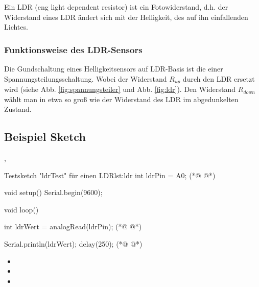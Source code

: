 Ein LDR (eng light dependent resistor)  ist ein Fotowiderstand, d.h.  der  Widerstand eines LDR ändert sich mit der Helligkeit, des auf ihn einfallenden Lichtes.

\subsubsection{Funktionsweise des LDR-Sensors}
Die Gundschaltung eines Helligkeitsensors auf LDR-Basis ist die einer Spannungsteilungsschaltung. Wobei
der  Widerstand $R_{up}$ durch den LDR ersetzt wird (siehe Abb. \ref{fig:spannungsteiler} und Abb. \ref{fig:ldr}).
Den Widerstand $R_{down}$ wählt man in etwa so groß wie der Widerstand des LDR im abgedunkelten Zustand.
  

\subsection{Beispiel Sketch}

\begin{multicols}{2}
\null\vfill
,\begin{arduinoCode}{Testsketch "ldrTest" für einen LDR}{lst:ldr}
int ldrPin = A0; (*@  @*) 

void setup(){
  Serial.begin(9600);
}

void loop(){
  int ldrWert = analogRead(ldrPin); (*@  @*)

  Serial.println(ldrWert);
  delay(250); (*@  @*)
}
\end{arduinoCode}
\vfill\null 
\columnbreak
\vfill\null 
\begin{itemize}
  \itemsep15pt
    \item[] 
    \item[] 
    \item[] 
  \end{itemize}
\vfill \null

\end{multicols}

